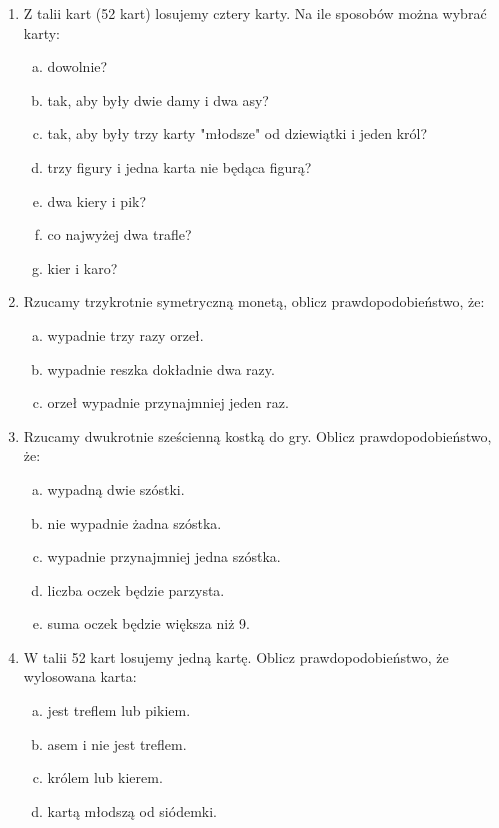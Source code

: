 \documentclass[12pt,a4paper]{article}
\begin{document}
\begin{enumerate}[1.]
\begin{enumerate}[a)]
	\item MATEMATYKA
	\item KONSTANTYNOPOLITAŃCZYKÓWIANECZKA*
\end{enumerate}
(* tam są 32 litery)
\item Z talii kart (52 kart) losujemy cztery karty. Na ile sposobów można wybrać karty:
\begin{enumerate}[a)]
	\item dowolnie?
	\item tak, aby były dwie damy i dwa asy?
	\item tak, aby były trzy karty "młodsze" od dziewiątki i jeden król?
	\item trzy figury i jedna karta nie będąca figurą?
	\item dwa kiery i pik?
	\item co najwyżej dwa trafle?
	\item kier i karo?
\end{enumerate}
\newpage
\item Rzucamy trzykrotnie symetryczną monetą, oblicz prawdopodobieństwo, że:
\begin{enumerate}[a)]
	\item wypadnie trzy razy orzeł.
	\item wypadnie reszka dokładnie dwa razy.
	\item orzeł wypadnie przynajmniej jeden raz.
\end{enumerate}
\item Rzucamy dwukrotnie sześcienną kostką do gry. Oblicz prawdopodobieństwo, że:
\begin{enumerate}[a)]
	\item wypadną dwie szóstki.
	\item nie wypadnie żadna szóstka.
	\item wypadnie przynajmniej jedna szóstka.
	\item liczba oczek będzie parzysta.
	\item suma oczek będzie większa niż 9.
\end{enumerate}
\item W talii 52 kart losujemy jedną kartę. Oblicz prawdopodobieństwo, że wylosowana karta:
\begin{enumerate}[a)]
	\item jest treflem lub pikiem.
	\item asem i nie jest treflem.
	\item królem lub kierem.
	\item kartą młodszą od siódemki.
\end{enumerate}

\end{enumerate}
\end{document}
